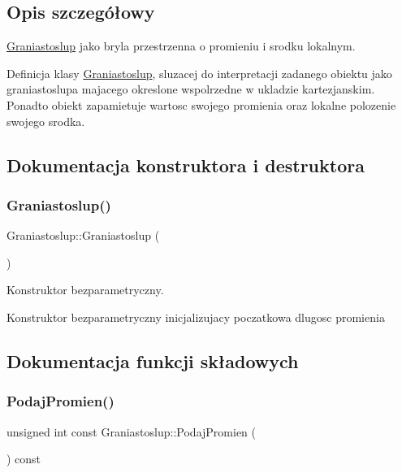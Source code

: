 \subsection{Opis szczegółowy}
\hyperlink{classGraniastoslup}{Graniastoslup} jako bryla przestrzenna o promieniu i srodku lokalnym. 

Definicja klasy \hyperlink{classGraniastoslup}{Graniastoslup}, sluzacej do interpretacji zadanego obiektu jako graniastoslupa majacego okreslone wspolrzedne w ukladzie kartezjanskim. Ponadto obiekt zapamietuje wartosc swojego promienia oraz lokalne polozenie swojego srodka. 

\subsection{Dokumentacja konstruktora i destruktora}
\mbox{\label{classGraniastoslup_a1bc529dd6c0e18a1ae30ac5f7a0836e3}} 
\subsubsection{\texorpdfstring{Graniastoslup()}{Graniastoslup()}}
{\footnotesize\ttfamily Graniastoslup\+::\+Graniastoslup (\begin{DoxyParamCaption}{ }\end{DoxyParamCaption})\hspace{0.3cm}{\ttfamily [inline]}}



Konstruktor bezparametryczny. 

Konstruktor bezparametryczny inicjalizujacy poczatkowa dlugosc promienia 

\subsection{Dokumentacja funkcji składowych}
\mbox{\label{classGraniastoslup_a7c5e6bb0c1761358af0e6ee80a8ab600}} 
\subsubsection{\texorpdfstring{Podaj\+Promien()}{PodajPromien()}}
{\footnotesize\ttfamily unsigned int const Graniastoslup\+::\+Podaj\+Promien (\begin{DoxyParamCaption}{ }\end{DoxyParamCaption}) const\hspace{0.3cm}{\ttfamily [inline]}}



